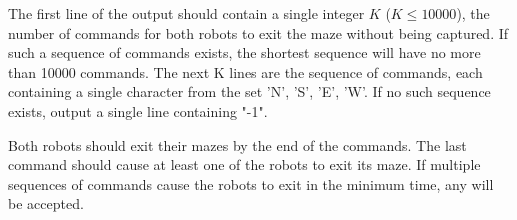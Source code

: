 The first line of the output should contain a single integer $K$ ($K \leq 10000$), the number of commands for both robots to exit the maze without being captured. If such a sequence of commands exists, the shortest sequence will have no more than 10000 commands. The next K lines are the sequence of commands, each containing a single character from the set {'N', 'S', 'E', 'W'}. If no such sequence exists, output a single line containing "-1". 

Both robots should exit their mazes by the end of the commands. The last command should cause at least one of the robots to exit its maze. If multiple sequences of
commands cause the robots to exit in the minimum time, any will be accepted.